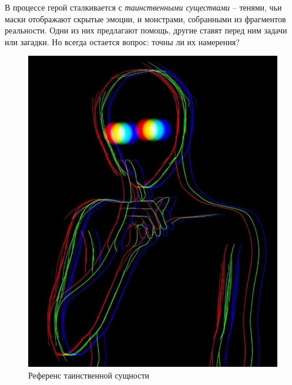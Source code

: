 \documentclass{article}
\begin{document}
	В процессе герой сталкивается с \textit{таинственными существами} – тенями, чьи маски отображают скрытые эмоции, и монстрами, собранными из фрагментов реальности. Одни из них предлагают помощь, другие ставят перед ним задачи или загадки. Но всегда остается вопрос: точны ли их намерения?
	
	\begin{figure}[h]
		\centering
		\begin{minipage}{0.45\textwidth}
			\centering
			\includegraphics[width=\textwidth]{images/entity3.jpg}
			\caption{Референс таинственной сущности}
			\label{fig:entity1}
		\end{minipage}
		\hfill
		\begin{minipage}{0.4\textwidth}
			\centering

\end{minipage}
\end{figure}
\end{document}
